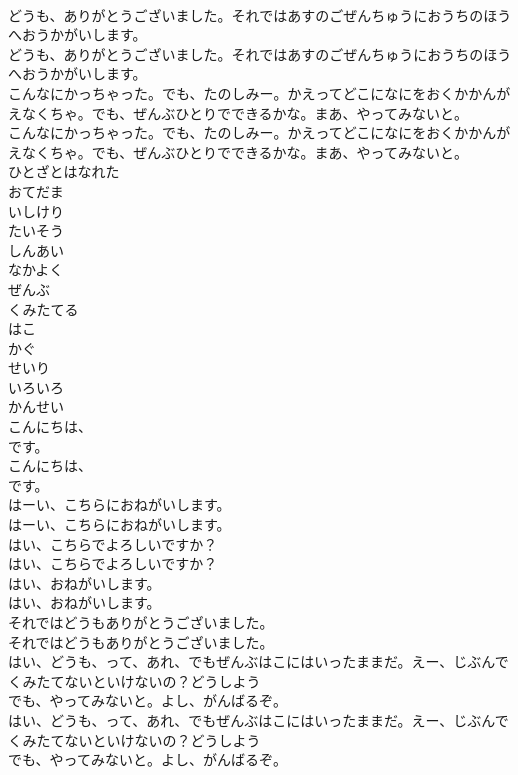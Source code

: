 \documentclass[8pt]{extreport}
\begin{document}
\begin{CJK}{UTF8}{min}
\\	どうも、ありがとうございました。それではあすのごぜんちゅうにおうちのほうへおうかがいします。	
\\	どうも、ありがとうございました。それではあすのごぜんちゅうにおうちのほうへおうかがいします。 
\\	こんなにかっちゃった。でも、たのしみー。かえってどこになにをおくかかんがえなくちゃ。でも、ぜんぶひとりでできるかな。まあ、やってみないと。	
\\	こんなにかっちゃった。でも、たのしみー。かえってどこになにをおくかかんがえなくちゃ。でも、ぜんぶひとりでできるかな。まあ、やってみないと。 
\\	ひとざとはなれた
\\	おてだま
\\	いしけり
\\	たいそう
\\	しんあい
\\	なかよく
\\	ぜんぶ
\\	くみたてる
\\	はこ
\\	かぐ
\\	せいり
\\	いろいろ
\\	かんせい
\\	こんにちは、
\\	です。	
\\	こんにちは、
\\	です。 
\\	はーい、こちらにおねがいします。	
\\	はーい、こちらにおねがいします。 
\\	はい、こちらでよろしいですか？	
\\	はい、こちらでよろしいですか？ 
\\	はい、おねがいします。	
\\	はい、おねがいします。 
\\	それではどうもありがとうございました。	
\\	それではどうもありがとうございました。 
\\	はい、どうも、って、あれ、でもぜんぶはこにはいったままだ。えー、じぶんでくみたてないといけないの？どうしよう
\\	でも、やってみないと。よし、がんばるぞ。	
\\	はい、どうも、って、あれ、でもぜんぶはこにはいったままだ。えー、じぶんでくみたてないといけないの？どうしよう
\\	でも、やってみないと。よし、がんばるぞ。 

\end{CJK}
\end{document}
